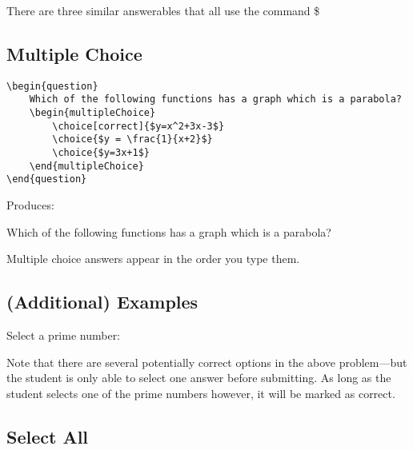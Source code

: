 \documentclass{ximera}
\begin{document}
There are three similar answerables that all use the command \$

\subsection{Multiple Choice}

\begin{verbatim}
\begin{question}
    Which of the following functions has a graph which is a parabola?
    \begin{multipleChoice}
        \choice[correct]{$y=x^2+3x-3$}
        \choice{$y = \frac{1}{x+2}$}
        \choice{$y=3x+1$}
    \end{multipleChoice}
\end{question}
\end{verbatim}

Produces:

\begin{question}
  Which of the following functions has a graph which is a parabola?
  \begin{multipleChoice}
  \end{multipleChoice}
\end{question}

\begin{remark}
  Multiple choice answers appear in the order you type them.
\end{remark}

\subsection{(Additional) Examples}

\begin{problem}
Select a prime number:
\begin{multipleChoice}
\end{multipleChoice}
\end{problem}

Note that there are several potentially correct options in the above
problem---but the student is only able to select one answer before submitting.
As long as the student selects one of the prime numbers however, it will be
marked as correct.

\subsection{Select All}
\end{document}
